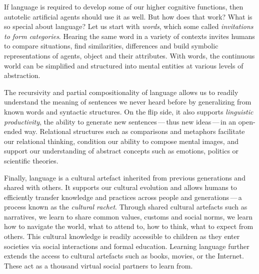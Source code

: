 If language is required to develop some of our higher cognitive functions, then autotelic artificial agents should use it as well. But how does that work? What is so special about language? 
Let us start with \textit{words}, which some called \textit{invitations to form categories}.\cite{waxman_words_1995} Hearing the same word in a variety of contexts invites humans to compare situations, find similarities, differences and build symbolic representations of agents, object and their attributes. With words, the continuous world can be simplified and structured into mental entities at various levels of abstraction. 

The recursivity and partial compositionality of language allows us to readily understand the meaning of sentences we never heard before by generalizing from known words and syntactic structures. On the flip side, it also supports \textit{linguistic productivity},\cite{chomsky_syntactic_1957} the ability to generate new sentences\,---\,thus new ideas\,---\,in an open-ended way. 
Relational structures such as comparisons and metaphors facilitate our relational thinking,\cite{gentner2002relational, gentner_analogy_2017} condition our ability to compose mental images,\cite{vyshedskiy_language_2019} and support our understanding of abstract concepts such as emotions, politics or scientific theories.\cite{hesse1988cognitive,lakoff2008metaphors} 

Finally, language is a cultural artefact inherited from previous generations and shared with others. It supports our cultural evolution and allows humans to efficiently transfer knowledge and practices across people and generations\cite{henrich2003evolution,morgan_experimental_2015,chopra2019first}\,---\,a process known as the \textit{cultural rachet}.\cite{tomasello_cultural_1999} Through shared cultural artefacts such as narratives, we learn to share common values, customs and social norms, we learn how to navigate the world, what to attend to, how to think, what to expect from others.\cite{bruner1990acts} This cultural knowledge is readily accessible to children as they enter societies via social interactions and formal education. Learning language further extends the access to cultural artefacts such as books, movies, or the Internet. These act as a thousand virtual social partners to learn from. 

